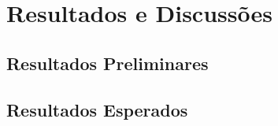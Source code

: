 
\chapter{Resultados e Discussões}

\section{Resultados Preliminares}


\section{Resultados Esperados}





